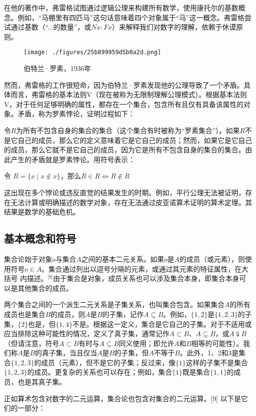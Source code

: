 在他的著作中，弗雷格试图通过逻辑公理来构建所有数学，使用康托尔的基数概念。例如，“马棚里有四匹马”这句话意味着四个对象属于“马”这一概念。弗雷格尝试通过基数（“...的数量”，或$Nx: Fx$）来解释我们对数字的理解，依赖于休谟原则。
\begin{figure}[ht]
\centering
\texttt{[image: ./figures/25b899959d5b0a2d.png]}
\caption{伯特兰·罗素，1936年} \label{fig_Set1_5}
\end{figure}
然而，弗雷格的工作很短命，因为伯特兰·罗素发现他的公理导致了一个矛盾。具体而言，弗雷格的基本法则V（现在被称为无限制理解公理模式）。根据基本法则V，对于任何足够明确的属性，都存在一个集合，包含所有且仅有具备该属性的对象。矛盾，称为罗素悖论，证明过程如下：

令$R$为所有不包含自身的集合的集合（这个集合有时被称为“罗素集合”）。如果$R$不是它自己的成员，那么它的定义意味着它是它自己的成员；然而，如果它是它自己的成员，那么它就不是它自己的成员，因为它是所有不包含自身的集合的集合。由此产生的矛盾就是罗素悖论。用符号表示：

令  
$R = \{x \mid x \notin x\}$，那么$R \in R \iff R \notin R$  

这出现在多个悖论或违反直觉的结果发生的时期。例如，平行公理无法被证明，存在无法计算或明确描述的数学对象，存在无法通过皮亚诺算术证明的算术定理。其结果是数学的基础危机。
\subsection{基本概念和符号}  
集合论始于对象$o$与集合$A$之间的基本二元关系。如果$o$是$A$的成员（或元素），则使用符号$o \in A$。集合通过列出以逗号分隔的元素，或通过其元素的特征属性，在大括号{ }内描述。\(^\text{[8]}\)由于集合是对象，成员关系也可以涉及集合本身，即集合本身可以是其他集合的成员。

两个集合之间的一个派生二元关系是子集关系，也叫集合包含。如果集合$A$的所有成员也是集合$B$的成员，则$A$是$B$的子集，记作$A \subseteq B$。例如，$\{1, 2\}$是$\{1, 2, 3\}$的子集，$\{2\}$也是，但$\{1, 4\}$不是。根据这一定义，集合是它自己的子集。对于不适用或应当排除这种可能性的情况，定义了真子集，通常记作$A \subset B$、$A \subsetneq B$，或$A \subsetneqq B$（但请注意，符号$A \subset B$有时与$A \subseteq B$同义使用；即允许$A$和$B$相等的可能性）。我们称$A$是$B$的真子集，当且仅当$A$是$B$的子集，但$A$不等于$B$。此外，1、2和3是集合$\{1, 2, 3\}$的成员（元素），但不是它的子集；反过来，像$\{1\}$这样的子集不是集合$\{1, 2, 3\}$的成员。更复杂的关系也可以存在；例如，集合$\{1\}$既是集合$\{1, {1}\}$的成员，也是其真子集。

正如算术包含对数字的二元运算，集合论也包含对集合的二元运算。[9] 以下是它们的一部分：

